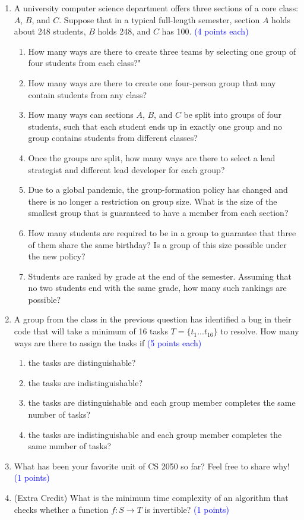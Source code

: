 \documentclass{article}
\newcommand{\pt}[1]{\textcolor{blue}{(#1 points)}}
\newcommand{\pte}[1]{\textcolor{blue}{(#1 points each)}}
\begin{document}
\begin{enumerate}
\item A university computer science department offers three sections of a core class: $A$, $B$, and $C$. Suppose that in a typical full-length semester, section $A$ holds about 248 students, $B$ holds 248, and $C$ has 100. \pte{4}
\begin{enumerate}
    \item How many ways are there to create three teams by selecting one group of four students from each class?"
    \item How many ways are there to create one four-person group that may contain students from any class?
    \item How many ways can sections $A$, $B$, and $C$ be split into groups of four students, such that each student ends up in exactly one group and no group contains students from different classes?
    \item Once the groups are split, how many ways are there to select a lead strategist and different lead developer for each group?
    \item Due to a global pandemic, the group-formation policy has changed and there is no longer a restriction on group size. What is the size of the smallest group that is guaranteed to have a member from each section?
    \item How many students are required to be in a group to guarantee that three of them share the same birthday? Is a group of this size possible under the new policy?
    \item Students are ranked by grade at the end of the semester. Assuming that no two students end with the same grade, how many such rankings are possible?
\end{enumerate}

\item A group from the class in the previous question has identified a bug in their code that will take a minimum of 16 tasks $T = \{t_1...t_{16}\}$ to resolve. How many ways are there to assign the tasks if \pte{5}
\begin{enumerate}
    \item the tasks are distinguishable?
    \item the tasks are indistinguishable?
    \item the tasks are distinguishable and each group member completes the same number of tasks?
    \item the tasks are indistinguishable and each group member completes the same number of tasks?
\end{enumerate}

\item What has been your favorite unit of CS 2050 so far? Feel free to share why! \pt{1}

\item (Extra Credit) What is the minimum time complexity of an algorithm that checks whether a function $f:S \rightarrow T$ is invertible? \pt{1}

\end{enumerate}
\end{document}

